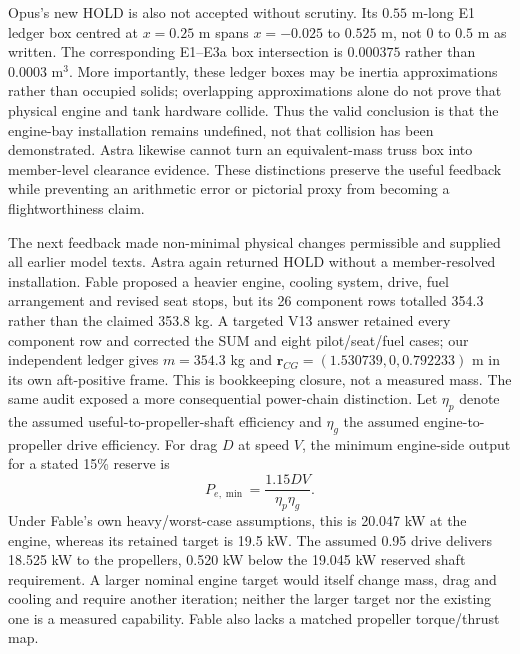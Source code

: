 \documentclass[11pt,a4paper]{article}
\begin{document}
Opus's new HOLD is also not accepted without scrutiny. Its $0.55$ m-long E1 ledger box centred at $x=0.25$ m spans $x=-0.025$ to $0.525$ m, not $0$ to $0.5$ m as written. The corresponding E1--E3a box intersection is $0.000375$ rather than $0.0003$ m$^3$. More importantly, these ledger boxes may be inertia approximations rather than occupied solids; overlapping approximations alone do not prove that physical engine and tank hardware collide. Thus the valid conclusion is that the engine-bay installation remains undefined, not that collision has been demonstrated. Astra likewise cannot turn an equivalent-mass truss box into member-level clearance evidence. These distinctions preserve the useful feedback while preventing an arithmetic error or pictorial proxy from becoming a flightworthiness claim.

The next feedback made non-minimal physical changes permissible and supplied all earlier model texts. Astra again returned HOLD without a member-resolved installation. Fable proposed a heavier engine, cooling system, drive, fuel arrangement and revised seat stops, but its 26 component rows totalled 354.3 rather than the claimed 353.8 kg. A targeted V13 answer retained every component row and corrected the SUM and eight pilot/seat/fuel cases; our independent ledger gives $m=354.3$ kg and $\boldsymbol r_{CG}=(1.530739,0,0.792233)$ m in its own aft-positive frame. This is bookkeeping closure, not a measured mass. The same audit exposed a more consequential power-chain distinction. Let $\eta_p$ denote the assumed useful-to-propeller-shaft efficiency and $\eta_g$ the assumed engine-to-propeller drive efficiency. For drag $D$ at speed $V$, the minimum engine-side output for a stated 15\% reserve is
\begin{equation}\label{eq:drivegate}
P_{e,\min}=\frac{1.15DV}{\eta_p\eta_g}.
\end{equation}
Under Fable's own heavy/worst-case assumptions, this is 20.047 kW at the engine, whereas its retained target is 19.5 kW. The assumed 0.95 drive delivers 18.525 kW to the propellers, 0.520 kW below the 19.045 kW reserved shaft requirement. A larger nominal engine target would itself change mass, drag and cooling and require another iteration; neither the larger target nor the existing one is a measured capability. Fable also lacks a matched propeller torque/thrust map.
\end{document}
